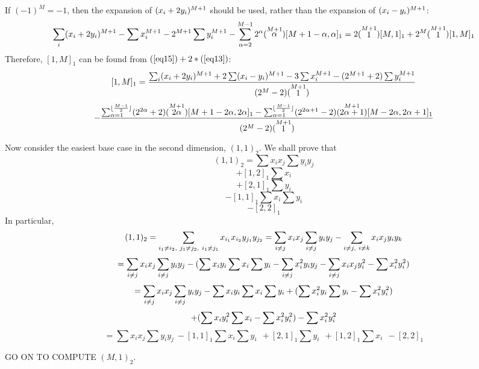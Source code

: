 If $(-1)^{M} = -1$, 
then the expansion of $(\xii+2\yi)^{M+1}$ should be used,
rather than the expansion of $(\xii-\yi)^{M+1}$:
\begin{equation}
\label{eq15}
\scriptsize{
\sum_{i} (\xii+2\yi)^{M+1} - \sum \xii^{M+1} - 2^{M+1} \sum \yi^{M+1} 
	- \sum_{\alpha = 2}^{M-1} 2^{\alpha} \choose{M+1}{\alpha} [M+1-\alpha,\alpha]_{1}
   = 2 \choose{M+1}{1} [M,1]_{1} + 2^{M} \choose{M+1}{1} [1,M]_{1}
}
\end{equation}
Therefore, $[1,M]_{1}$ can be found from 
$(\ref{eq15}) + 2 * (\ref{eq13})$:
\begin{equation}
\label{eq16}
\scriptsize{
[1,M]_{1} = \frac{\sum_{i} (\xii+2\yi)^{M+1} + 2 \sum (x_{i} - y_{i})^{M+1}
	- 3 \sum \xii^{M+1} - (2^{M+1}+2) \sum \yi^{M+1}}{(2^{M}-2)\choose{M+1}{1}}
}
\end{equation}
\[
\scriptsize{
	- \frac{\sum_{\alpha = 1}^{\lfloor \frac{M-1}{2} \rfloor} (2^{2\alpha} + 2) 
	\choose{M+1}{2\alpha} [M+1-2\alpha,2\alpha]_{1}
	- \sum_{\alpha = 1}^{\lfloor \frac{M-1}{2} \rfloor} (2^{2\alpha + 1} - 2) 
	\choose{M+1}{2\alpha + 1} [M-2\alpha,2\alpha+1]_{1}}{(2^{M}-2)\choose{M+1}{1}}
}
\]


Now consider the easiest base case in the second dimension, $(1,1)_{2}$.
We shall prove that
\[ (1,1)_{2} = \sum x_{i}x_{j} \sum y_{i}y_{j} 
\]
\[
		+ [1,2]_{1} \sum x_{i}
\]
\[
		+ [2,1]_{1} \sum y_{i}
\]
\[
		- [1,1]_{1} \sum x_{i} \sum y_{i}
\]
\[
		- [2,2]_{1}
\]
In particular, 
\[ (1,1)_{2} = \sum_{i_{1} \neq i_{2},\ j_{1} \neq j_{2},\ i_{1} \neq j_{1}} 
		x_{i_{1}} x_{i_{2}} y_{j_{1}} y_{j_{2}}
      = \sum_{i \neq j} x_{i}x_{j} \sum_{i \neq j} y_{i}y_{j} 
      - \sum_{i \neq j,\ i \neq k} \xii\xj\yi y_{k}
\]
\[ = \sum_{i \neq j} x_{i}x_{j} \sum_{i \neq j} y_{i}y_{j} 
      - (\sum \xii\yi  \sum \xii  \sum \yi  
       - \sum_{i \neq j} \xii^{2} \yi \yj
       - \sum_{i \neq j} \xii  \xj \yi^{2}
       - \sum \xii^{2} \yi^{2})
\]
\[ = \sum_{i \neq j} x_{i}x_{j} \sum_{i \neq j} y_{i}y_{j} 
      - \sum \xii\yi  \sum \xii  \sum \yi  
      + (\sum \xii^{2} \yi \sum \yi  - \sum \xii^{2} \yi^{2})
\]
\[
      + (\sum \xii \yi^{2} \sum \xii  - \sum \xii^{2} \yi^{2})
      - \sum \xii^{2} \yi^{2} 
\]
\[ = \sum x_{i}x_{j} \sum y_{i}y_{j} \ 
		- [1,1]_{1} \sum x_{i} \sum y_{i} \ \ 
		+ [2,1]_{1} \sum y_{i} \ \ 
		+ [1,2]_{1} \sum x_{i} \ \ 
		- [2,2]_{1}
\]

GO ON TO COMPUTE $(M,1)_{2}$.


